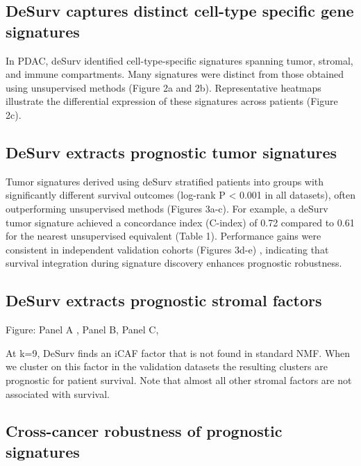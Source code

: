 \documentclass[9pt,twocolumn,twoside,]{pnas-new}
\begin{document}
\subsection*{DeSurv captures distinct cell-type specific gene
signatures}\label{desurv-captures-distinct-cell-type-specific-gene-signatures}

In PDAC, deSurv identified cell-type-specific signatures spanning tumor,
stromal, and immune compartments. Many signatures were distinct from
those obtained using unsupervised methods (Figure 2a and 2b).
Representative heatmaps illustrate the differential expression of these
signatures across patients (Figure 2c).

\subsection*{DeSurv extracts prognostic tumor
signatures}\label{desurv-extracts-prognostic-tumor-signatures}

Tumor signatures derived using deSurv stratified patients into groups
with significantly different survival outcomes (log-rank P \textless{}
0.001 in all datasets), often outperforming unsupervised methods
(Figures 3a-c). For example, a deSurv tumor signature achieved a
concordance index (C-index) of 0.72 compared to 0.61 for the nearest
unsupervised equivalent (Table 1). Performance gains were consistent in
independent validation cohorts (Figures 3d-e) , indicating that survival
integration during signature discovery enhances prognostic robustness.

\subsection*{DeSurv extracts prognostic stromal
factors}\label{desurv-extracts-prognostic-stromal-factors}

Figure: Panel A , Panel B, Panel C,

At k=9, DeSurv finds an iCAF factor that is not found in standard NMF.
When we cluster on this factor in the validation datasets the resulting
clusters are prognostic for patient survival. Note that almost all other
stromal factors are not associated with survival.

\subsection*{Cross-cancer robustness of prognostic
signatures}\label{cross-cancer-robustness-of-prognostic-signatures}
\end{document}
